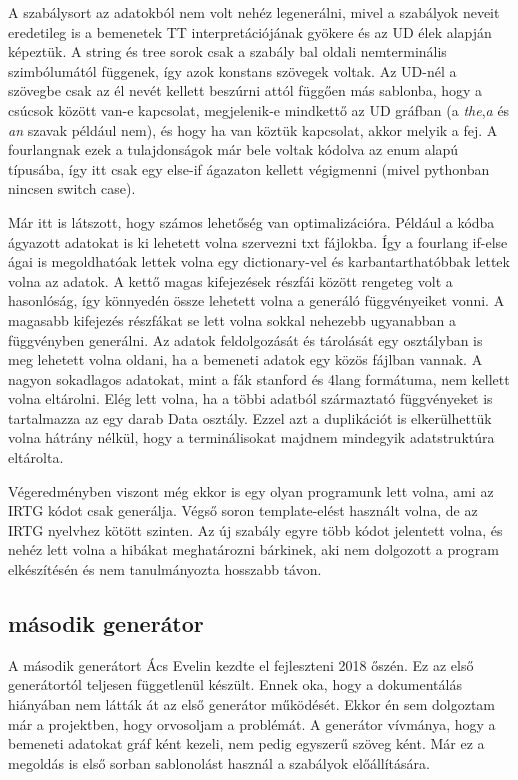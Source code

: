 A szabálysort az adatokból nem volt nehéz legenerálni, mivel a szabályok neveit eredetileg is a bemenetek TT interpretációjának gyökere és az UD élek alapján képeztük. A string és tree sorok csak a szabály bal oldali nemterminális szimbólumától függenek, így azok konstans szövegek voltak. Az UD-nél a szövegbe csak az él nevét kellett beszúrni attól függően más sablonba, hogy a csúcsok között van-e kapcsolat, megjelenik-e mindkettő az UD gráfban (a \textit{the},\textit{a} és \textit{an} szavak például nem), és hogy ha van köztük kapcsolat, akkor melyik a fej. A fourlangnak ezek a tulajdonságok már bele voltak kódolva az enum alapú típusába, így itt csak egy else-if ágazaton kellett végigmenni (mivel pythonban nincsen switch case).

Már itt is látszott, hogy számos lehetőség van optimalizációra. Például a kódba ágyazott adatokat is ki lehetett volna szervezni txt fájlokba. Így a fourlang if-else ágai is megoldhatóak lettek volna egy dictionary-vel és karbantarthatóbbak lettek volna az adatok. A kettő magas kifejezések részfái között rengeteg volt a hasonlóság, így könnyedén össze lehetett volna a generáló függvényeiket vonni. A magasabb kifejezés részfákat se lett volna sokkal nehezebb ugyanabban a függvényben generálni. Az adatok feldolgozását és tárolását egy osztályban is meg lehetett volna oldani, ha a bemeneti adatok egy közös fájlban vannak. A nagyon sokadlagos adatokat, mint a fák stanford és 4lang formátuma, nem kellett volna eltárolni. Elég lett volna, ha a többi adatból származtató függvényeket is tartalmazza az egy darab Data osztály. Ezzel azt a duplikációt is elkerülhettük volna hátrány nélkül, hogy a terminálisokat majdnem mindegyik adatstruktúra eltárolta.

Végeredményben viszont még ekkor is egy olyan programunk lett volna, ami az IRTG kódot csak generálja. Végső soron template-elést használt volna, de az IRTG nyelvhez kötött szinten. Az új szabály egyre több kódot jelentett volna, és nehéz lett volna a hibákat meghatározni bárkinek, aki nem dolgozott a program elkészítésén és nem tanulmányozta hosszabb távon.


\subsection{második generátor}
\label{sec:generator2}
A második generátort Ács Evelin kezdte el fejleszteni 2018 őszén.
Ez az első generátortól teljesen függetlenül készült.
Ennek oka, hogy a dokumentálás hiányában nem látták át az első generátor működését.
Ekkor én sem dolgoztam már a projektben, hogy orvosoljam a problémát.
A generátor vívmánya, hogy a bemeneti adatokat gráf ként kezeli, nem pedig egyszerű szöveg ként.
Már ez a megoldás is első sorban sablonolást használ a szabályok előállítására.

